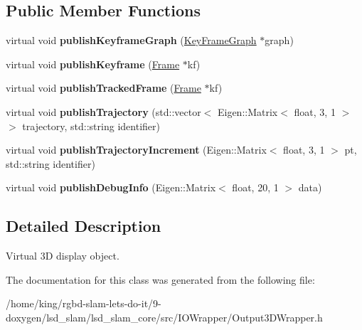 \subsection*{Public Member Functions}
\begin{DoxyCompactItemize}
\item 
\hypertarget{classlsd__slam_1_1_output3_d_wrapper_a4b91b74ec0c7c8b4fc7d80beb4853c35}{virtual void {\bfseries publish\-Keyframe\-Graph} (\hyperlink{classlsd__slam_1_1_key_frame_graph}{Key\-Frame\-Graph} $\ast$graph)}\label{classlsd__slam_1_1_output3_d_wrapper_a4b91b74ec0c7c8b4fc7d80beb4853c35}

\item 
\hypertarget{classlsd__slam_1_1_output3_d_wrapper_a524f65c21ef553f626a75e24e3ea10f5}{virtual void {\bfseries publish\-Keyframe} (\hyperlink{classlsd__slam_1_1_frame}{Frame} $\ast$kf)}\label{classlsd__slam_1_1_output3_d_wrapper_a524f65c21ef553f626a75e24e3ea10f5}

\item 
\hypertarget{classlsd__slam_1_1_output3_d_wrapper_a679c2193d1eba147a88d362eda088d72}{virtual void {\bfseries publish\-Tracked\-Frame} (\hyperlink{classlsd__slam_1_1_frame}{Frame} $\ast$kf)}\label{classlsd__slam_1_1_output3_d_wrapper_a679c2193d1eba147a88d362eda088d72}

\item 
\hypertarget{classlsd__slam_1_1_output3_d_wrapper_aff80413d7e0f925b673da9368be657d0}{virtual void {\bfseries publish\-Trajectory} (std\-::vector$<$ Eigen\-::\-Matrix$<$ float, 3, 1 $>$$>$ trajectory, std\-::string identifier)}\label{classlsd__slam_1_1_output3_d_wrapper_aff80413d7e0f925b673da9368be657d0}

\item 
\hypertarget{classlsd__slam_1_1_output3_d_wrapper_a72ad5d3823f98413b0b565d6315f781c}{virtual void {\bfseries publish\-Trajectory\-Increment} (Eigen\-::\-Matrix$<$ float, 3, 1 $>$ pt, std\-::string identifier)}\label{classlsd__slam_1_1_output3_d_wrapper_a72ad5d3823f98413b0b565d6315f781c}

\item 
\hypertarget{classlsd__slam_1_1_output3_d_wrapper_a0b3bd60770aa486fc36465a5275ab1cd}{virtual void {\bfseries publish\-Debug\-Info} (Eigen\-::\-Matrix$<$ float, 20, 1 $>$ data)}\label{classlsd__slam_1_1_output3_d_wrapper_a0b3bd60770aa486fc36465a5275ab1cd}

\end{DoxyCompactItemize}


\subsection{Detailed Description}
Virtual 3\-D display object. 

The documentation for this class was generated from the following file\-:\begin{DoxyCompactItemize}
\item 
/home/king/rgbd-\/slam-\/lets-\/do-\/it/9-\/doxygen/lsd\-\_\-slam/lsd\-\_\-slam\-\_\-core/src/\-I\-O\-Wrapper/Output3\-D\-Wrapper.\-h\end{DoxyCompactItemize}
